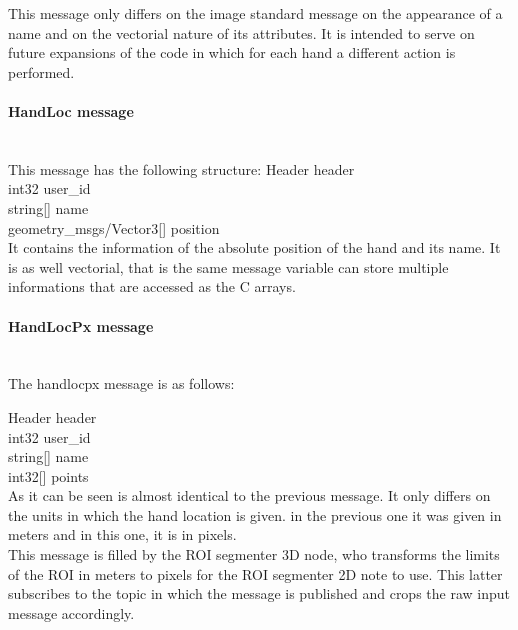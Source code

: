		This message only differs on the image standard message on the appearance of a name and on the vectorial nature of its attributes. It is intended to serve on future expansions of the code in which for each hand a different action is performed. 

	\paragraph{HandLoc message}\mbox{} \\

		This message has the following structure: 
		Header header\\
		int32 user\_id\\
		string[] name\\
		geometry\_msgs/Vector3[] position
		\\

		It contains the information of the absolute position of the hand and its name. It is as well vectorial, that is the same message variable can store multiple informations that are accessed as the C arrays. 

	\paragraph{HandLocPx message}\mbox{} \\
	
		The handlocpx message is as follows: 

		Header header\\
		int32 user\_id\\
		string[] name\\
		int32[] points\\

		As it can be seen is almost identical to the previous message. It only differs on the units in which the hand location is given. in the previous one it was given in meters and in this one, it is in pixels. 
		\\

	This message is filled by the ROI segmenter 3D node, who transforms the limits of the ROI in meters to pixels for the ROI segmenter 2D note to use. This latter subscribes to the topic in which the message is published and crops the raw input message accordingly. 